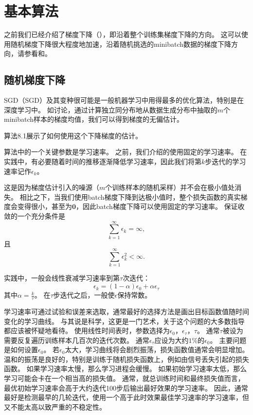
\section{基本算法}
\label{sec:basic_algorithms}
之前我们已经介绍了梯度下降（），即沿着整个训练集梯度下降的方向。
这可以使用随机梯度下降很大程度地加速，沿着随机挑选的\gls{minibatch}数据的梯度下降方向，请参看和。

\subsection{随机梯度下降}
\label{sec:stochastic_gradient_descent_chap8}
\gls{SGD}（SGD）及其变种很可能是一般机器学习中用得最多的优化算法，特别是在深度学习中。
如讨论，通过计算独立同分布地从数据生成分布中抽取的$m$个\gls{minibatch}样本的梯度均值，我们可以得到梯度的无偏估计。

算法8.1展示了如何使用这个下降梯度的估计。

算法中的一个关键参数是学习速率。
之前，我们介绍的使用固定的学习速率。
在实践中，有必要随着时间的推移逐渐降低学习速率，因此我们将第$k$步迭代的学习速率记作$\epsilon_k$。

这是因为梯度估计引入的噪源（$m$个训练样本的随机采样）并不会在极小值处消失。
相比之下，当我们使用\gls{batch}梯度下降到达极小值时，整个损失函数的真实梯度会变得很小，甚至为$\mathbf{0}$，因此\gls{batch}梯度下降可以使用固定的学习速率。
保证收敛的一个充分条件是
\begin{equation}
\label{eq:8.12}
    \sum_{k=1}^\infty \epsilon_k = \infty,
\end{equation}
且
\begin{equation}
\label{eq:8.13}
    \sum_{k=1}^\infty \epsilon_k^2 < \infty.
\end{equation}


实践中，一般会线性衰减学习速率到第$\tau$次迭代：
\begin{equation}
\label{eq:8.14}
    \epsilon_k = (1-\alpha) \epsilon_0 + \alpha \epsilon_\tau
\end{equation}
其中$\alpha = \frac{k}{\tau}$。
在$\tau$步迭代之后，一般使$\epsilon$保持常数。

学习速率可通过试验和误差来选取，通常最好的选择方法是画出目标函数值随时间变化的学习曲线。
与其说是科学，这更是一门艺术，关于这个问题的大多数指导都应该被怀疑地看待。
使用线性时间表时，参数选择为$\epsilon_0$，$\epsilon_\tau$，$\tau$。  
通常$\tau$被设为需要反复遍历训练样本几百次的迭代次数。
通常$\epsilon_\tau$应设为大约$1\%$的$\epsilon_0$。
主要问题是如何设置$\epsilon_0$。
若$\epsilon_0$太大，学习曲线将会剧烈振荡，损失函数值通常会明显增加。
温和的振荡是良好的，特别是训练于随机损失函数上，例如由信号丢失引起的损失函数。
如果学习速率太慢，那么学习进程会缓慢。
如果初始学习速率太低，那么学习可能会卡在一个相当高的损失值。
通常，就总训练时间和最终损失值而言，最优初始学习速率会高于大约迭代100步后输出最好效果的学习速率。
因此，通常最好是检测最早的几轮迭代，使用一个高于此时效果最佳学习速率的学习速率，但又不能太高以致严重的不稳定性。  

